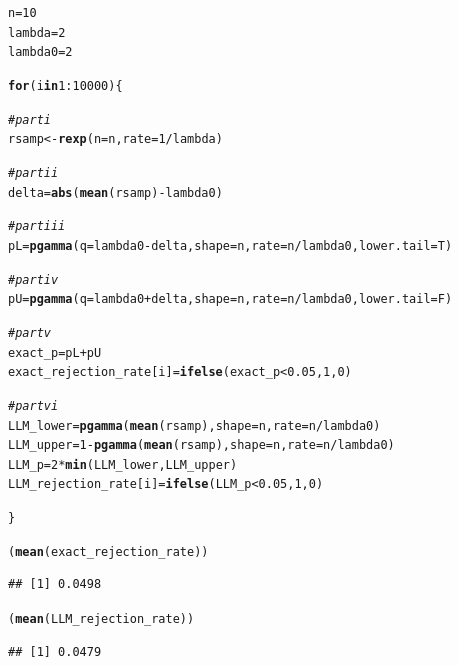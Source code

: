 \documentclass{article}\usepackage[]{graphicx}\usepackage[]{xcolor}
\makeatletter
\newcommand{\hlnum}[1]{\textcolor[rgb]{0.686,0.059,0.569}{#1}}%
\newcommand{\hlcom}[1]{\textcolor[rgb]{0.678,0.584,0.686}{\textit{#1}}}%
\newcommand{\hlopt}[1]{\textcolor[rgb]{0,0,0}{#1}}%
\newcommand{\hldef}[1]{\textcolor[rgb]{0.345,0.345,0.345}{#1}}%
\newcommand{\hlkwa}[1]{\textcolor[rgb]{0.161,0.373,0.58}{\textbf{#1}}}%
\newcommand{\hlkwb}[1]{\textcolor[rgb]{0.69,0.353,0.396}{#1}}%
\newcommand{\hlkwc}[1]{\textcolor[rgb]{0.333,0.667,0.333}{#1}}%
\newcommand{\hlkwd}[1]{\textcolor[rgb]{0.737,0.353,0.396}{\textbf{#1}}}%
\newenvironment{kframe}{%
 \def\at@end@of@kframe{}%
 \ifinner\ifhmode%
  \def\at@end@of@kframe{\end{minipage}}%
  \begin{minipage}{\columnwidth}%
 \fi\fi%
 \def\FrameCommand##1{\hskip\@totalleftmargin \hskip-\fboxsep
 \colorbox{shadecolor}{##1}\hskip-\fboxsep
     \hskip-\linewidth \hskip-\@totalleftmargin \hskip\columnwidth}%
 \MakeFramed {\advance\hsize-\width
   \@totalleftmargin\z@ \linewidth\hsize
   \@setminipage}}%
 {\par\unskip\endMakeFramed%
 \at@end@of@kframe}
\newenvironment{knitrout}{}{} %
\makeatother
\begin{document}
\begin{enumerate}
\begin{enumerate}
\begin{knitrout}
\begin{kframe}
\begin{alltt}
\hldef{n} \hlkwb{=} \hlnum{10}
\hldef{lambda} \hlkwb{=} \hlnum{2}
\hldef{lambda0} \hlkwb{=} \hlnum{2}

\hlkwa{for} \hldef{(i} \hlkwa{in} \hlnum{1}\hlopt{:}\hlnum{10000}\hldef{)\{}

  \hlcom{# part i}
  \hldef{rsamp} \hlkwb{<-} \hlkwd{rexp}\hldef{(}\hlkwc{n} \hldef{= n,} \hlkwc{rate} \hldef{=} \hlnum{1}\hlopt{/}\hldef{lambda)}

  \hlcom{# part ii}
  \hldef{delta} \hlkwb{=} \hlkwd{abs}\hldef{(}\hlkwd{mean}\hldef{(rsamp)} \hlopt{-} \hldef{lambda0)}

  \hlcom{#part iii}
  \hldef{pL} \hlkwb{=} \hlkwd{pgamma}\hldef{(}\hlkwc{q} \hldef{= lambda0}\hlopt{-}\hldef{delta,} \hlkwc{shape} \hldef{= n,} \hlkwc{rate} \hldef{= n}\hlopt{/}\hldef{lambda0,} \hlkwc{lower.tail} \hldef{= T)}

  \hlcom{# part iv}
  \hldef{pU} \hlkwb{=} \hlkwd{pgamma}\hldef{(}\hlkwc{q} \hldef{= lambda0}\hlopt{+}\hldef{delta,} \hlkwc{shape} \hldef{= n,} \hlkwc{rate} \hldef{= n}\hlopt{/}\hldef{lambda0,} \hlkwc{lower.tail} \hldef{= F)}

  \hlcom{#part v}
  \hldef{exact_p} \hlkwb{=} \hldef{pL} \hlopt{+} \hldef{pU}
  \hldef{exact_rejection_rate[i]} \hlkwb{=} \hlkwd{ifelse}\hldef{(exact_p} \hlopt{<} \hlnum{0.05}\hldef{,} \hlnum{1}\hldef{,} \hlnum{0}\hldef{)}

  \hlcom{#part vi}
  \hldef{LLM_lower} \hlkwb{=} \hlkwd{pgamma}\hldef{(}\hlkwd{mean}\hldef{(rsamp),} \hlkwc{shape} \hldef{= n,} \hlkwc{rate} \hldef{= n}\hlopt{/}\hldef{lambda0)}
  \hldef{LLM_upper} \hlkwb{=} \hlnum{1} \hlopt{-} \hlkwd{pgamma}\hldef{(}\hlkwd{mean}\hldef{(rsamp),} \hlkwc{shape} \hldef{= n,} \hlkwc{rate} \hldef{= n}\hlopt{/}\hldef{lambda0)}
  \hldef{LLM_p} \hlkwb{=} \hlnum{2}\hlopt{*}\hlkwd{min}\hldef{(LLM_lower, LLM_upper)}
  \hldef{LLM_rejection_rate[i]} \hlkwb{=} \hlkwd{ifelse}\hldef{(LLM_p} \hlopt{<} \hlnum{0.05}\hldef{,} \hlnum{1}\hldef{,} \hlnum{0}\hldef{)}

\hldef{\}}

\hldef{(}\hlkwd{mean}\hldef{(exact_rejection_rate))}
\end{alltt}
\begin{verbatim}
## [1] 0.0498
\end{verbatim}
\begin{alltt}
\hldef{(}\hlkwd{mean}\hldef{(LLM_rejection_rate))}
\end{alltt}
\begin{verbatim}
## [1] 0.0479
\end{verbatim}
\end{kframe}
\end{knitrout}


\end{enumerate}
\end{enumerate}
\end{document}
